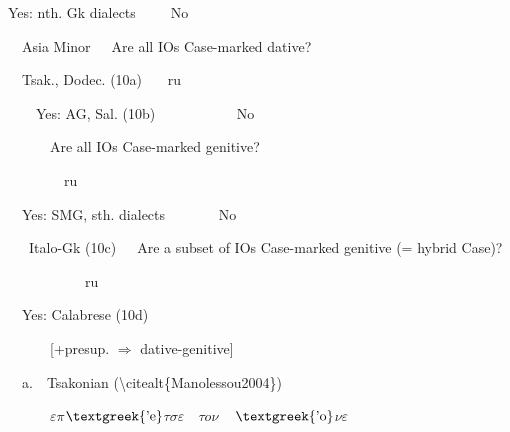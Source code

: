 \documentclass[output=paper,modfonts,nonflat]{langsci/langscibook}
\begin{document}
\begin{styleStandard}
Yes: nth. Gk dialects\ \  \ \ \ No\ \ \ \ 
\end{styleStandard}

\begin{styleStandard}
\ \  Asia Minor\ \  \ Are all IOs Case-marked dative?\ \ \ \ 
\end{styleStandard}

\begin{styleStandard}
\ \  Tsak., Dodec. (10a) \ \ \ ru\ \ \ \ \ \ 
\end{styleStandard}

\begin{styleStandard}
\ \ \ \  Yes: AG, Sal. (10b) \ \ \ \ \ \ \ \ \ \ \ No \ \ \ \ 
\end{styleStandard}

\begin{styleStandard}
\ \ \ \  \ \ Are all IOs Case-marked genitive?\ \ 
\end{styleStandard}

\begin{styleStandard}
\ \ \ \  \ \ \ \ ru\ \ 
\end{styleStandard}

\begin{styleStandard}
\ \  Yes: SMG, sth. dialects \ \ \ \ \ \  \ No\ \ 
\end{styleStandard}

\begin{styleStandard}
\ \  \ Italo-Gk (10c)\ \  \ Are a subset of IOs Case-marked genitive (= hybrid Case)?
\end{styleStandard}

\begin{styleStandard}
\ \ \ \  \ \ \ \ \ \ \ ru\ \ 
\end{styleStandard}

\begin{styleStandard}
\ \ Yes: Calabrese (10d)\ \  
\end{styleStandard}

\begin{styleStandard}
\ \  \ \ \ \ [+presup. ${\Rightarrow}$ dative-genitive]\ \ 
\end{styleStandard}

\begin{listWWNumviiileveli}
\item 
\begin{styleListParagraph}
\ \ a.\ \ Tsakonian ({\textbackslash}citealt\{Manolessou2004\})
\end{styleListParagraph}
\end{listWWNumviiileveli}
\begin{styleListParagraph}
\ \ \ \ \ \ \textit{${\varepsilon}{\pi}$$\text{\textgreek{'e}}$${\tau}$$\sigma $${\varepsilon}$\ \ }\textbf{\textit{${\tau}o{\nu}$\ \ $\text{\textgreek{'o}}$${\nu}{\varepsilon}$ }}
\end{styleListParagraph}
\end{document}
